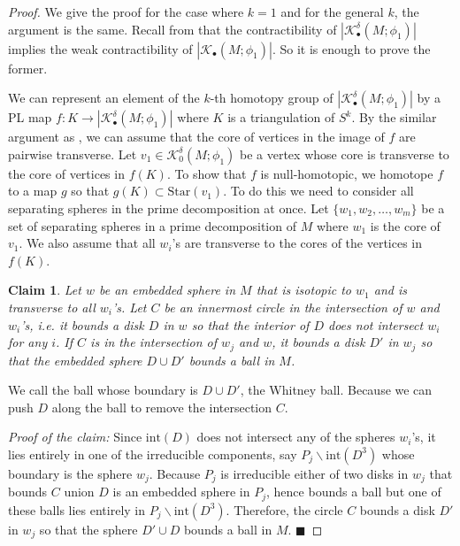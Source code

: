 \documentclass[a4paper]{amsart}
\newtheorem{claim}[thm]{Claim}
\theoremstyle{definition}
\theoremstyle{remark}
\numberwithin{equation}{section}
\begin{document}
\begin{proof}
We give the proof for the case where $k=1$ and for the general $k$, the argument is the same. Recall from  that  the contractibility of $|\mathcal{K}^{\delta}_{\bullet}(M;\phi_1)|$ implies the weak contractibility of $|\mathcal{K}_{\bullet}(M;\phi_1)|$.  So it is enough to prove the former.

 We can represent an element of the $k$-th homotopy group of $|\mathcal{K}^{\delta}_{\bullet}(M;\phi_1)|$ by a PL map $f: K\to |\mathcal{K}^{\delta}_{\bullet}(M;\phi_1)|$ where  $K$ is a triangulation of $S^k$. By the similar argument as , we can assume that the core of vertices in the image of $f$ are pairwise transverse. Let $v_1\in \mathcal{K}^{\delta}_{0}(M;\phi_1)$ be a vertex whose core is transverse to the core of vertices in $f(K)$. To show that $f$ is null-homotopic, we homotope $f$ to a map $g$ so that $g(K)\subset \text{Star}(v_1)$. To do this we need to consider all separating spheres in the prime decomposition at once. Let  $\{w_1, w_2, \dots, w_m\}$ be a set of separating spheres  in a prime decomposition of $M$ where $w_1$ is the core of $v_1$. We also assume that all $w_i$'s are transverse to the cores of the vertices in $f(K)$.  
\begin{claim}
Let $w$ be an embedded sphere in $M$ that is isotopic to $w_1$ and is transverse to all $w_i$'s. Let $C$ be an innermost circle in the intersection of $w$ and $w_i$'s, i.e. it bounds a disk $D$ in $w$ so that the interior of $D$ does not intersect $w_i$ for any $i$. If $C$ is in the intersection of $w_j$ and $w$, it bounds a disk $D'$ in $w_j$ so that the embedded sphere $D\cup D'$ bounds a ball in $M$.
\end{claim}
We call the ball  whose boundary is $D\cup D'$, the Whitney ball. Because we can push $D$ along the ball  to remove the intersection $C$.

\noindent\textit{Proof of the claim:} Since $\text{int}(D)$ does not intersect any of the spheres $w_i$'s, it lies entirely in one of the irreducible components, say $P_j\backslash \text{int}(D^3)$ whose boundary is the sphere $w_j$. Because $P_j$ is irreducible either of two disks in $w_j$ that bounds $C$ union $D$ is an embedded sphere in $P_j$, hence bounds a ball but one of these balls lies entirely in $P_j\backslash \text{int}(D^3)$. Therefore, the circle $C$ bounds a disk $D'$ in $w_j$ so that the sphere $D'\cup D$ bounds a ball in $M$. $\blacksquare$


\end{proof}
\end{document}
